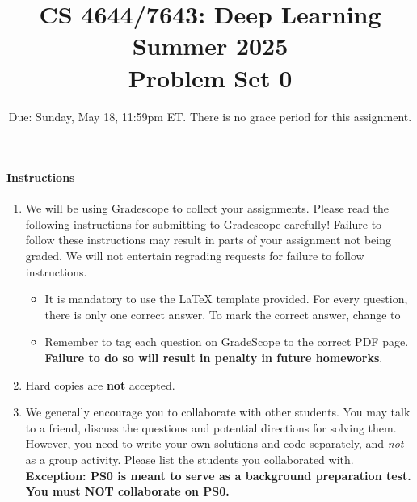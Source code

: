 \documentclass[11pt,english, answers]{exam}
\begin{document}
\title{CS 4644/7643: Deep Learning\\
Summer 2025 \\
Problem Set 0}

\date{Due: Sunday, May 18, 11:59pm ET. There is no grace period for this assignment. }

\maketitle

\paragraph*{Instructions}
\begin{enumerate}
 \item We will be using Gradescope to collect your assignments.  Please read the following instructions for submitting to Gradescope carefully! Failure to follow these instructions may result in parts of your assignment not being graded. We will not entertain regrading requests for failure to follow instructions.
      \begin{itemize}
        \item
         It is mandatory to use the {\LaTeX} template provided.
           For every question, there is only one correct answer. To mark the correct answer, change \codeword{\choice} to \codeword{\CorrectChoice}
        \item
        Remember to tag each question on GradeScope to the correct PDF page. \textbf{Failure to do so will result in penalty in future homeworks}.
      \end{itemize}

 \item Hard copies are \textbf{not} accepted.
\item We generally encourage you to collaborate with other students. You may talk to a friend,
discuss the questions and potential directions for solving them. However, you need to write
your own solutions and code separately, and \emph{not} as a group activity.
Please list the students you collaborated with. \\
\textbf{Exception: PS0 is meant to serve as a background preparation test. You must NOT collaborate on PS0.}

\end{enumerate}

\pagebreak

% 
%
%
\end{document}
